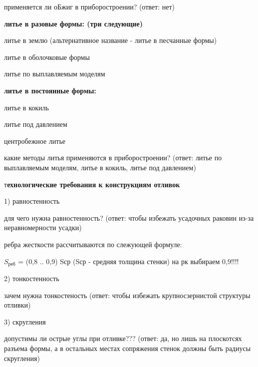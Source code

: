 {\begin{center}
    \par применяется ли оБжиг в приборостроении? (ответ: нет)

    \par \textbf{литье в разовые формы: (три следующие)}

    \par литье в землю (альтернативное название - литье в песчанные формы)

    \par литье в оболочковые формы 

    \par литье по выплавляемым моделям

    \par \textbf{литье в постоянные формы:} 

    \par литье в кокиль

    \par литье под давлением 

    \par центробежное литье

    \par какие методы литья применяются в приборостроении? (ответ: литье по выплавляемым моделям, литье в кокиль, литье под давлением)

    \par т\textbf{ехнологические требования к конструкциям отливок}

    \par 1) равностенность

    \par для чего нужна равностенность? (ответ: чтобы избежать усадочных раковин из-за неравномерности усадки)

    \par ребра жесткости рассчитываются по слежующей формуле:

    \par $S_{реб}$ = (0,8 .. 0,9) Sср  (Sср - средняя толщина стенки) на рк выбираем 0,9!!!!

    \par 2) тонкостенность 

    \par зачем нужна тонкостеность (ответ: чтобы избежать крупносзернистой структуры отливки)

    \par 3) скругления

    \par допустимы ли острые углы при отливке??? (ответ: да, но лишь на плоскотсях разъема формы, а в остальных местах сопряжения стенок должны быть радиусы скругления)


\end{center}}
